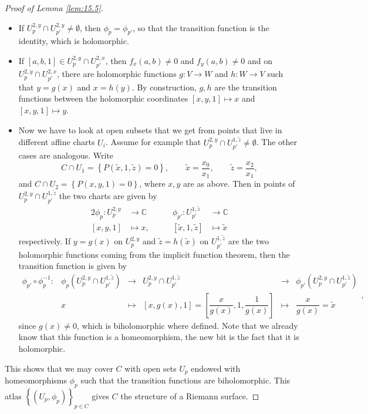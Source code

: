 \documentclass{article}
\newcommand{\C}{\mathbb{C}}
\newcommand{\rb}[1]{\left( #1 \right)}
\renewcommand{\sb}[1]{\left[ #1 \right]}
\newcommand{\cb}[1]{\left\{ #1 \right\}}
\theoremstyle{definition}\newtheorem{definition}{Definition}[section]
\theoremstyle{definition}\newtheorem{notation}[definition]{Notation}
\theoremstyle{definition}\newtheorem{remark}[definition]{Remark}
\theoremstyle{definition}\newtheorem{example1}[definition]{Example}
\theoremstyle{definition}\newtheorem{fact}{Fact}
\theoremstyle{definition}\newtheorem{exercise}{Exercise}
\theoremstyle{definition}\newtheorem*{example2}{Example}
\begin{document}
\begin{proof}[Proof of Lemma \ref{lem:15.5}]
\begin{itemize}
\item If $ U_p^{2, y} \cap U_{p'}^{2, y} \ne \emptyset $, then $ \phi_p = \phi_{p'} $, so that the transition function is the identity, which is holomorphic.
\item If $ \sb{a, b, 1} \in U_p^{2, y} \cap U_{p'}^{2, x} $, then $ f_x\rb{a, b} \ne 0 $ and $ f_y\rb{a, b} \ne 0 $ and on $ U_p^{2, y} \cap U_{p'}^{2, x} $, there are holomorphic functions $ g : V \to W $ and $ h : W \to V $ such that $ y = g\rb{x} $ and $ x = h\rb{y} $. By construction, $ g, h $ are the transition functions between the holomorphic coordinates $ \sb{x, y, 1} \mapsto x $ and $ \sb{x, y, 1} \mapsto y $.
\item Now we have to look at open subsets that we get from points that live in different affine charts $ U_i $. Assume for example that $ U_p^{2, y} \cap U_{p'}^{1, \widetilde{z}} \ne \emptyset $. The other cases are analogous. Write
$$ C \cap U_1 = \cb{P\rb{\widetilde{x}, 1, \widetilde{z}} = 0}, \qquad \tilde{x} = \dfrac{x_0}{x_1}, \qquad \tilde{z} = \dfrac{x_2}{x_1}, $$
and $ C \cap U_2 = \cb{P\rb{x, y, 1} = 0} $, where $ x, y $ are as above. Then in points of $ U_p^{2, y} \cap U_{p'}^{1, \widetilde{z}} $ the two charts are given by
\begin{alignat*}{2}
\phi_p : U_p^{2, y} & \to \C & \qquad \phi_{p'} : U_{p'}^{1, \widetilde{z}} & \to \C \\
\sb{x, y, 1} & \mapsto x, & \qquad \sb{\widetilde{x}, 1, \widetilde{z}} & \mapsto \widetilde{x}
\end{alignat*}
respectively. If $ y = g\rb{x} $ on $ U_p^{2, y} $ and $ \widetilde{z} = h\rb{\widetilde{x}} $ on $ U_{p'}^{1, \widetilde{z}} $ are the two holomorphic functions coming from the implicit function theorem, then the transition function is given by
$$
\begin{array}{cccccc}
\phi_{p'} \circ \phi_p^{-1} : & \phi_p\rb{U_p^{2, y} \cap U_{p'}^{1, \widetilde{z}}} & \to & U_p^{2, y} \cap U_{p'}^{1, \widetilde{z}} & \to & \phi_{p'}\rb{U_p^{2, y} \cap U_{p'}^{1, \widetilde{z}}} \\
& x & \mapsto & \sb{x, g\rb{x}, 1} = \sb{\dfrac{x}{g\rb{x}}, 1, \dfrac{1}{g\rb{x}}} & \mapsto & \dfrac{x}{g\rb{x}} = \widetilde{x}
\end{array},
$$
since $ g\rb{x} \ne 0 $, which is biholomorphic where defined. Note that we already know that this function is a homeomorphism, the new bit is the fact that it is holomorphic.
\end{itemize}
This shows that we may cover $ C $ with open sets $ U_p $ endowed with homeomorphisms $ \phi_p $ such that the transition functions are biholomorphic. This atlas $ \cb{\rb{U_p, \phi_p}}_{p \in C} $ gives $ C $ the structure of a Riemann surface.
\end{proof}
\end{document}
